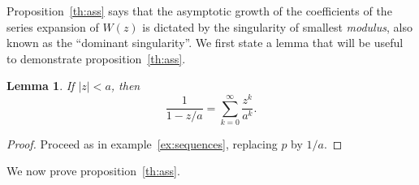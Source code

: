 \documentclass{article}
\newtheorem{lemma}{Lemma}
\begin{document}
Proposition~\ref{th:ass} says that the asymptotic growth of the
coefficients of the series expansion of $W(z)$ is dictated by the
singularity of smallest \textit{modulus}, also known as the ``dominant
singularity''. We first state a lemma that will be useful to demonstrate
proposition~\ref{th:ass}.

\begin{lemma}
\label{lemma:poles}
If $|z| < a$, then
\begin{equation}
\label{eq:poles}
\frac{1}{1-z/a} = \sum_{k=0}^\infty \frac{z^k}{a^k}.
\end{equation}
\end{lemma}

\begin{proof}
Proceed as in example~\ref{ex:sequences}, replacing $p$ by $1/a$.
\end{proof}

We now prove proposition~\ref{th:ass}.
\end{document}
